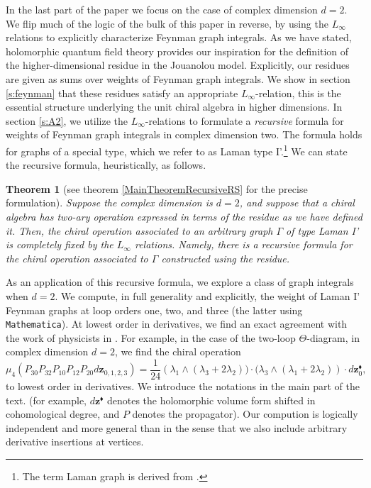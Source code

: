 \documentclass[11pt]{amsart}
\newtheorem*{thm*}{Theorem}
\theoremstyle{definition}
\theoremstyle{remark}
\numberwithin{equation}{section}
\begin{document}
In the last part of the paper we focus on the case of complex dimension $d=2$.
We flip much of the logic of the bulk of this paper in reverse, by using the $L_\infty$ relations to explicitly
characterize Feynman graph integrals.
As we have stated, holomorphic quantum field theory provides our inspiration for the definition of the higher-dimensional residue in
the Jouanolou model.
Explicitly, our residues are given as sums over weights of Feynman graph integrals.
We show in section \ref{s:feynman} that these residues satisfy an appropriate $L_\infty$-relation, this is the essential
structure underlying the unit chiral algebra in higher dimensions.
In section \ref{s:A2}, we utilize the $L_\infty$-relations to formulate a \textit{recursive} formula for weights
of Feynman graph integrals in complex dimension two.
The formula holds for graphs of a special type, which we refer to as Laman type I'.\footnote{The term Laman graph is derived
from \cite{Laman1970OnGA}.}
We can state the recursive formula, heuristically, as follows.

\begin{thm*}[see theorem \ref{MainTheoremRecursiveRS} for the precise formulation]
  Suppose the complex dimension is $d=2$, and suppose that a chiral algebra has two-ary operation expressed in terms
  of the residue
  as we have defined it.
Then, the chiral operation associated to an arbitrary graph $\Gamma$ of type Laman I' is completely fixed by the $L_\infty$
relations.
Namely, there is a recursive formula for the chiral operation associated to $\Gamma$ constructed using the residue.
\end{thm*}

As an application of this recursive formula, we explore a class of graph integrals when $d=2$.
We compute, in full generality and explicitly, the weight of Laman I' Feynman graphs at loop orders one, two, and three (the latter using
\texttt{Mathematica}).
At lowest order in derivatives, we find an exact agreement with the work of physicists in \cite{Gaiotto:2024gii}.
For example, in the case of the two-loop $\Theta$-diagram, in complex dimension $d=2$, we find the chiral operation
\begin{equation}\label{}
  \mu_4 (P_{30} P_{32} P_{10} P_{12}P_{20} d \mathbf{z}_{0,1,2,3}) = \frac{1}{24} \left(\lambda_1 \wedge (\lambda_3 + 2 \lambda_2)) \cdot
    (\lambda_3 \wedge (\lambda_1 + 2 \lambda_2) \right)\cdot d \mathbf{z}_0^{\blacklozenge} ,
\end{equation}
to lowest order in derivatives.
We introduce the notations in the main part of the text.
(for example,  $d \mathbf{z}^{\blacklozenge}$ denotes the holomorphic volume form shifted in cohomological degree, and
$P$ denotes the propagator).
Our compution is logically independent and more general than \cite{budzik2023feynman} in the sense that we also include arbitrary derivative insertions
at vertices. 
\end{document}
